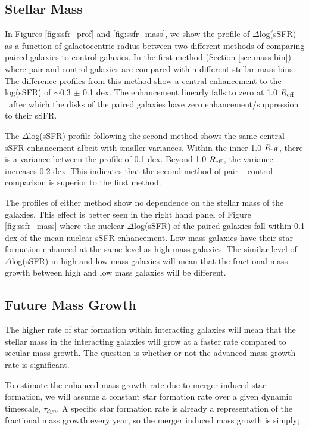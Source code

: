 \documentclass[iop,revtex4,twocolumn,apj,numberedappendix,appendixfloats]{emulateapj}
\newcommand{\reff}{$R_{\rm eff}$}
\begin{document}
\subsection{Stellar Mass}

In Figures \ref{fig:ssfr_prof} and \ref{fig:ssfr_mass}, we show the profile of $\Delta$log(sSFR) as a function of galactocentric radius between two different methods of comparing paired galaxies to control galaxies. In the first method (Section \ref{sec:mass-bin}) where pair and control galaxies are compared within different stellar mass bins. The difference profiles from this method show a central enhancement to the log(sSFR) of $\sim$0.3 $\pm$ 0.1 dex. The enhancement linearly falls to zero at 1.0 \reff\ after which the disks of the paired galaxies have zero enhancement/suppression to their sSFR. 

The $\Delta$log(sSFR) profile following the second method shows the same central sSFR enhancement albeit with smaller variances. Within the inner 1.0 \reff, there is a variance between the profile of 0.1 dex. Beyond 1.0 \reff, the variance increases 0.2 dex. This indicates that the second method of pair$-$ control comparison is superior to the first method. 

The profiles of either method show no dependence on the stellar mass of the galaxies.  This effect is better seen in the right hand panel of Figure \ref{fig:ssfr_mass} where the nuclear $\Delta$log(sSFR) of the paired galaxies fall within 0.1 dex of the mean nuclear sSFR enhancement. Low mass galaxies have their star formation enhanced at the same level as high mass galaxies. The similar level of $\Delta$log(sSFR) in high and low mass galaxies will mean that the fractional mass growth between high and low mass galaxies will be different.

\subsection{Future Mass Growth}

The higher rate of star formation within interacting galaxies will mean that the stellar mass in the interacting galaxies will grow at a faster rate compared to secular mass growth. The question is whether or not the advanced mass growth rate is significant. 

To estimate the enhanced mass growth rate due to merger induced star formation, we will assume a constant star formation rate over a given dynamic timescale, $\tau_{dyn}$. A specific star formation rate is already a representation of the fractional mass growth every year, so the merger induced mass growth is simply;
\end{document}
